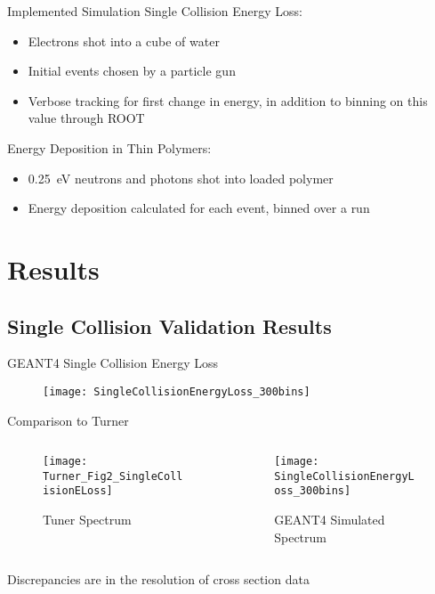 \documentclass[compress]{beamer}
\begin{document}
\begin{frame}[fragile]{Implemented Simulation}
  Single Collision Energy Loss:
  \begin{itemize}
     \item Electrons shot into a cube of water
     \item Initial events chosen by a particle gun
     \item Verbose tracking for first change in energy, in addition to binning on this value through ROOT
  \end{itemize}
  Energy Deposition in Thin Polymers:
  \begin{itemize}
    \item \SI{0.25}{\eV} neutrons and  photons shot into  loaded polymer
    \item Energy deposition calculated for each event, binned over a run
  \end{itemize}
\end{frame}
\section{Results}
\subsection{Single Collision Validation Results}
\begin{frame}{GEANT4 Single Collision Energy Loss}
  \begin{figure}
    \texttt{[image: SingleCollisionEnergyLoss\_300bins]}
  \end{figure}
\end{frame}
\begin{frame}{Comparison to Turner}
  \begin{columns}[onlytextwidth]
    \begin{column}{0.45\textwidth}
      \begin{figure}
        \texttt{[image: Turner\_Fig2\_SingleCollisionELoss]}
        \caption{Tuner Spectrum}
      \end{figure}
    \end{column}
    \begin{column}{0.45\textwidth}
      \begin{figure}
        \texttt{[image: SingleCollisionEnergyLoss\_300bins]}
        \caption{GEANT4 Simulated Spectrum}
    \end{figure}
    \end{column}
  \end{columns}
\vspace{2mm}
Discrepancies are in the resolution of cross section data
\end{frame}
\end{document}
